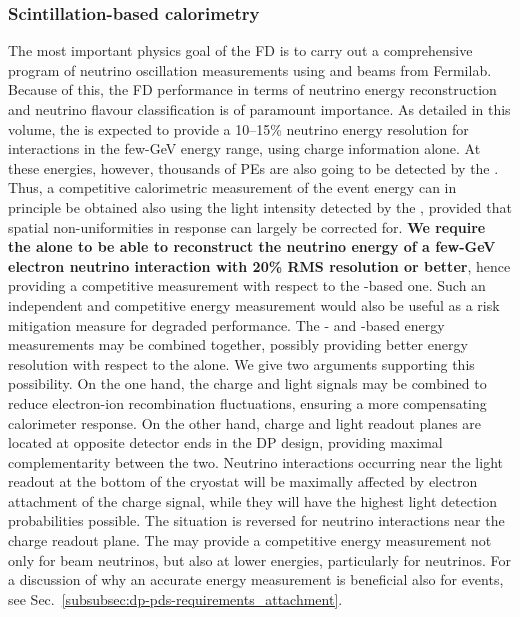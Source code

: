 \subsubsection{Scintillation-based calorimetry}

The most important physics goal of the  FD is to carry out a comprehensive program of neutrino oscillation measurements using \numu and \anumu beams from Fermilab. Because of this, the  FD performance in terms of neutrino energy reconstruction and neutrino flavour classification is of paramount importance. As detailed in this volume, the  is expected to provide a 10--15\% neutrino energy resolution for \nue {} interactions in the few-GeV energy range, using charge information alone. At these energies, however, thousands of PEs are also going to be detected by the . Thus, a competitive calorimetric measurement of the event energy can in principle be obtained also using the light intensity detected by the , provided that spatial non-uniformities in  response can largely be corrected for. {\bf We require the  alone to be able to reconstruct the neutrino energy of a few-GeV electron neutrino  interaction with 20\% RMS resolution or better}, hence providing a competitive measurement with respect to the -based one. Such an independent and competitive energy measurement would also be useful as a risk mitigation measure for degraded  performance. The - and -based energy measurements may be combined together, possibly providing better energy resolution with respect to the  alone. We give two arguments supporting this possibility. On the one hand, the charge and light signals may be combined to reduce electron-ion recombination fluctuations, ensuring a more compensating  calorimeter response. On the other hand, charge and light readout planes are located at opposite detector ends in the DP design, providing maximal complementarity between the two. Neutrino interactions occurring near the light readout at the bottom of the cryostat will be maximally affected by electron attachment of the charge signal, while they will have the highest light detection probabilities possible. The situation is reversed for neutrino interactions near the charge readout plane. The  may provide a competitive energy measurement not only for beam neutrinos, but also at lower energies, particularly for  neutrinos. For a discussion of why an accurate energy measurement is beneficial also for  events, see Sec.~\ref{subsubsec:dp-pds-requirements_attachment}.

